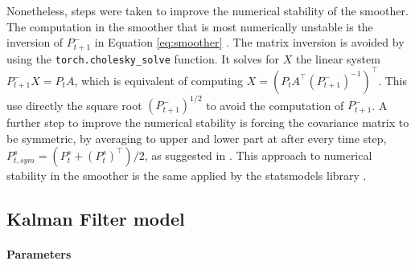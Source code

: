 \documentclass{article}
\let\Oldsubsection\subsection
\renewcommand{\subsection}{\FloatBarrier\Oldsubsection}
\begin{document}
Nonetheless, steps were taken to improve the numerical stability of the smoother. The computation in the smoother that is most numerically unstable is the inversion of $P^-_{t+1}$ in Equation \ref{eq:smoother} \cite{mohinder_s_grewal_kalman_2001}. The matrix inversion is avoided by using the \verb|torch.cholesky_solve| function. It solves for $X$ the linear system $P^-_{t+1}X=P_tA$, which is equivalent of computing $X = (P_tA^\top(P^-_{t+1})^{-1})^\top$. This use directly the square root $(P^-_{t+1})^{1/2}$ to avoid the computation of $P^-_{t+1}$. A further step to improve the numerical stability is forcing the covariance matrix to be symmetric, by averaging to upper and lower part at after every time step, $P^s_{t, sym} = (P^s_t + (P^s_t)^\top)/2$, as suggested in \textcite{dan_simon_optimal_2006}.
This approach to numerical stability in the smoother is the same applied by the \textsf{statsmodels} library \cite{noauthor_statsmodelstsastatespacekalman_filterkalmanfilter_nodate}.

\subsection{Kalman Filter model}

\paragraph{Parameters}
\end{document}
